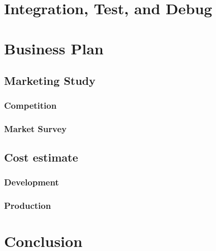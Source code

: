 \documentclass{article}
\begin{document}
\section{Integration, Test, and Debug}

\section{Business Plan}
    \subsection{Marketing Study}
        \subsubsection{Competition}
        \subsubsection{Market Survey}
    \subsection{Cost estimate}
        \subsubsection{Development}
        \subsubsection{Production}

\section{Conclusion}

\newpage




\end{document}
